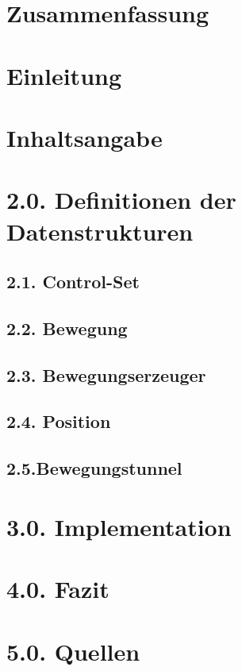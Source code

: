 \documentclass[11pt,a4paper,oneside]{report}
\begin{document}


\section*{Zusammenfassung}


\section*{Einleitung}


\section*{Inhaltsangabe}

\section*{2.0. Definitionen der Datenstrukturen}

\subsection*{2.1. Control-Set}

\subsection*{2.2. Bewegung}

\subsection*{2.3. Bewegungserzeuger}

\subsection*{2.4. Position}

\subsection*{2.5.Bewegungstunnel}


\section*{3.0. Implementation}


\section*{4.0. Fazit}

\section*{5.0. Quellen}

\end{document}
